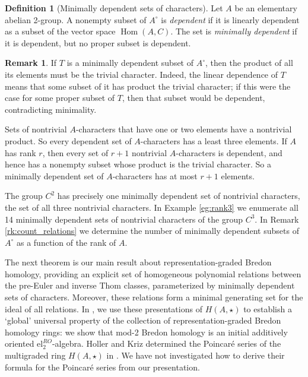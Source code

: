 \documentclass{amsart}[12pt]
\DeclareMathOperator{\Hom}{Hom}
\numberwithin{equation}{section}
\theoremstyle{definition}
\newtheorem{defn}[equation]{Definition}
\newtheorem{rk}[equation]{Remark}
\begin{document}
\begin{defn}[Minimally dependent sets of characters]
  Let $A$ be an elementary abelian 2-group.
  A nonempty subset of $A^\circ$ is {\em dependent}
  if it is linearly dependent as a subset of the vector space $\Hom(A,C)$.
  The set is {\em minimally dependent} if it is dependent, but no proper subset is dependent.
\end{defn}


\begin{rk}\label{rk:cardinality_minimal}
If $T$ is a minimally dependent subset of $A^\circ$,
then the product of all its elements must be the trivial character.
Indeed, the linear dependence of $T$ means that
some subset of it has product the trivial character;
if this were the case for some proper subset of $T$,
then that subset would be dependent, contradicting minimality.

Sets of nontrivial $A$-characters that have one or two elements
have a nontrivial product.
So every dependent set of $A$-characters has a least three elements.
If $A$ has rank $r$, then every set of $r+1$ nontrivial $A$-characters is dependent,
and hence has a nonempty subset whose product is the trivial character.
So a minimally dependent set of $A$-characters has at most $r+1$ elements.

The group $C^2$ has precisely one minimally dependent set of nontrivial characters,
the set of all three nontrivial characters.
In Example \ref{eg:rank3} we enumerate all 14 minimally dependent sets of nontrivial characters
of the group $C^3$.
In Remark \ref{rk:count_relations} we determine the number of minimally dependent subsets
of $A^\circ$ as a function of the rank of $A$.
\end{rk}

The next theorem is our main result about representation-graded Bredon homology,
providing an explicit set of homogeneous polynomial relations between the
pre-Euler and inverse Thom classes,
parameterized by minimally dependent sets of characters.
Moreover, these relations form a minimal generating set for the ideal of all relations.
In \cite[Theorem 3.5]{hausmann-schwede:bordism}, we use these presentations of
$H(A,\star)$ to establish a `global' universal property of the collection of representation-graded
Bredon homology rings: we show that mod-2 Bredon homology is an initial additively
oriented $\textrm{el}^{R O}_2$-algebra.
Holler and Kriz determined the Poincar{\'e} series of the multigraded ring
$H(A,\star)$ in \cite[Theorem 5]{holler-kriz}.
We have not investigated how to derive their formula for the 
Poincar{\'e} series from our presentation.
\end{document}
